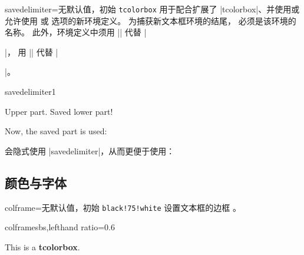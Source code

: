 \clearpage
\begin{docTcbKey}{savedelimiter}{=}{无默认值，初始 \texttt{tcolorbox}}
  用于配合扩展了 |tcolorbox|、并使用或允许使用
   或  选项的新环境定义。
  为捕获新文本框环境的结尾， 必须是该环境的名称。
  此外，环境定义中须用 |\tcolorbox| 代替 |\begin{tcolorbox}|，
  用 |\endtcolorbox| 代替 |\end{tcolorbox}|。
\begin{exdispExample}{savedelimiter1}
\newenvironment{mybox}[1]{%
  \tcolorbox[savedelimiter=mybox,
             savelowerto=\jobname_bspsave3.tex,lowerbox=ignored,
             colback=red!5!white,colframe=red!75!black,fonttitle=\bfseries,
             title={#1}]}%
  {\endtcolorbox}

\begin{mybox}{My Example}
Upper part.
\tcblower
Saved lower part!
\end{mybox}

Now, the saved part is used:
\begin{tcolorbox}[colback=green!5]

\end{tcolorbox}
\end{exdispExample}

\enlargethispage*{1cm}

 会隐式使用 |savedelimiter|，从而更便于使用：
\end{docTcbKey}



\clearpage
\subsection{颜色与字体}
\begin{docTcbKey}{colframe}{=}{无默认值，初始 \texttt{black!75!white}}
  设置文本框的边框 。
\begin{exdispExample*}{colframe}{sbs,lefthand ratio=0.6}
\begin{tcolorbox}[colframe=red!50!white]
This is a \textbf{tcolorbox}.
\end{tcolorbox}
\end{exdispExample*}
\end{docTcbKey}

